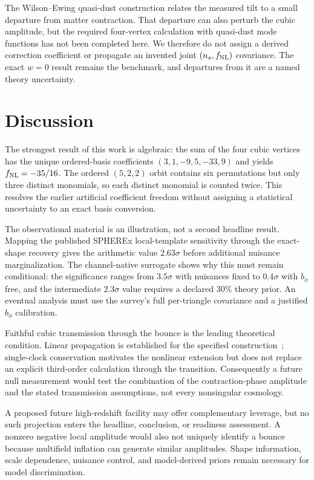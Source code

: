 \documentclass[aps,prd,twocolumn,superscriptaddress,showpacs,preprintnumbers,nofootinbib,longbibliography,floatfix]{revtex4-2}
\newcommand{\fnl}{f_{\rm NL}}
\begin{document}
The Wilson--Ewing quasi-dust construction relates the measured tilt to a small departure from matter contraction. That departure can also perturb the cubic amplitude, but the required four-vertex calculation with quasi-dust mode functions has not been completed here. We therefore do not assign a derived correction coefficient or propagate an invented joint $(n_s,\fnl)$ covariance. The exact $w=0$ result remains the benchmark, and departures from it are a named theory uncertainty.

\section{Discussion}
\label{sec:discussion}

The strongest result of this work is algebraic: the sum of the four cubic vertices has the unique ordered-basis coefficients $(3,1,-9,5,-33,9)$ and yields $\fnl=-35/16$. The ordered $(5,2,2)$ orbit contains six permutations but only three distinct monomials, so each distinct monomial is counted twice. This resolves the earlier artificial coefficient freedom without assigning a statistical uncertainty to an exact basis conversion.

The observational material is an illustration, not a second headline result. Mapping the published SPHEREx local-template sensitivity through the exact-shape recovery gives the arithmetic value $2.63\sigma$ before additional nuisance marginalization. The channel-native surrogate shows why this must remain conditional: the significance ranges from $3.5\sigma$ with nuisances fixed to $0.4\sigma$ with $b_\phi$ free, and the intermediate $2.3\sigma$ value requires a declared 30\% theory prior. An eventual analysis must use the survey's full per-triangle covariance and a justified $b_\phi$ calibration.

Faithful cubic transmission through the bounce is the leading theoretical condition. Linear propagation is established for the specified construction~\cite{WilsonEwing:2012}; single-clock conservation motivates the nonlinear extension but does not replace an explicit third-order calculation through the transition. Consequently a future null measurement would test the combination of the contraction-phase amplitude and the stated transmission assumptions, not every nonsingular cosmology.

A proposed future high-redshift facility may offer complementary leverage, but no such projection enters the headline, conclusion, or readiness assessment. A nonzero negative local amplitude would also not uniquely identify a bounce because multifield inflation can generate similar amplitudes. Shape information, scale dependence, nuisance control, and model-derived priors remain necessary for model discrimination.
\end{document}
